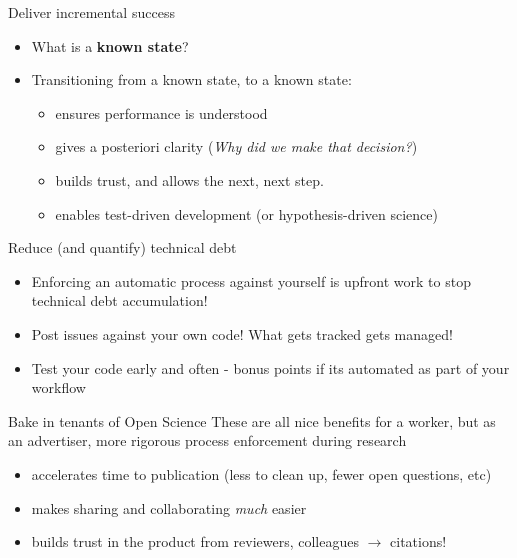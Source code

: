 \documentclass{beamer}
\begin{document}
\begin{frame}{Deliver incremental success}
  \begin{itemize}
  \item What is a \textbf{known state}?
  \item Transitioning from a known state, to a known state:
    \begin{itemize}
    \item ensures performance is understood
    \item gives a posteriori clarity (\textit{Why did we make that decision?})
    \item builds trust, and allows the next, next step.
    \item enables test-driven development (or hypothesis-driven science)
    \end{itemize}
  \end{itemize}
\end{frame}

\begin{frame}{Reduce (and quantify) technical debt}
  \begin{itemize}
  \item Enforcing an automatic process against yourself is upfront work to stop technical debt accumulation!
  \item Post issues against your own code! What gets tracked gets managed!
  \item Test your code early and often - bonus points if its automated as part of your workflow
  \end{itemize}
\end{frame}


\begin{frame}{Bake in tenants of Open Science}
  These are all nice benefits for a worker, but as an advertiser, more rigorous process enforcement during research
  \begin{itemize}
  \item accelerates time to publication (less to clean up, fewer open questions, etc)
  \item makes sharing and collaborating \textit{much} easier
  \item builds trust in the product from reviewers, colleagues $\to$ citations!
  \end{itemize}
\end{frame}
\end{document}
